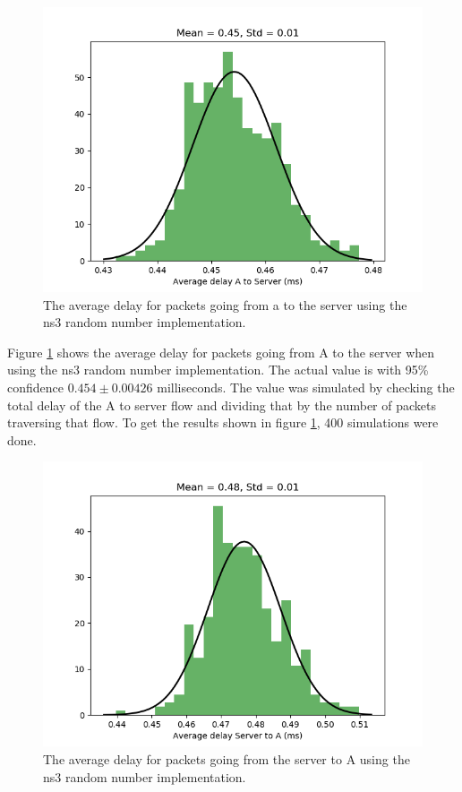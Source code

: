 \documentclass{article}
\begin{document}
\begin{figure}[!htbp]
    \centering
    \includegraphics[width=0.85\linewidth]{ns3_as_delay.png}
    \caption{The average delay for packets going from a to the server using the ns3 random number implementation.}
    \label{fig:AtoServerNs3}
\end{figure}

Figure \ref{fig:AtoServerNs3} shows the average delay for packets going from A to the server when using the ns3 random number implementation.
The actual value is with 95\% confidence $0.454 \pm 0.00426$ milliseconds.
The value was simulated by checking the total delay of the A to server flow and dividing that by the number of packets traversing that flow.
To get the results shown in figure \ref{fig:AtoServerNs3}, 400 simulations were done.

\begin{figure}[!htbp]
    \centering
    \includegraphics[width=0.85\linewidth]{ns3_sa_delay.png}
    \caption{The average delay for packets going from the server to A using the ns3 random number implementation.}
    \label{fig:ServerToANs3}
\end{figure}
\end{document}
